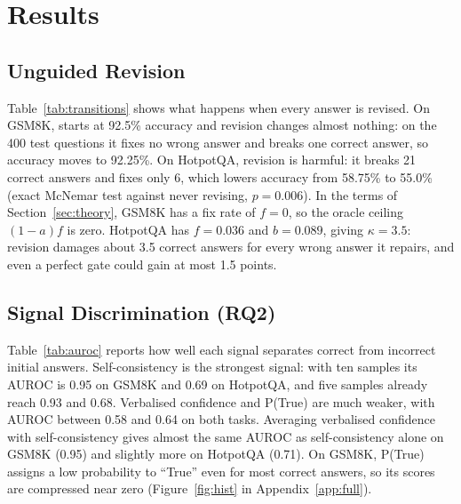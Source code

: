 \section{Results}
\label{sec:experiments}

\subsection{Unguided Revision}
\begin{table}[ht]
\centering
\caption{Outcome of unguided (always) revision on the test set ($N=400$ per dataset). We report initial accuracy $\text{Acc}(A_0)$, transition frequencies ($W\to R$, $R\to W$, $R\to R$, $W\to W$), accuracy delta $\Delta = \text{Acc}(A_1) - \text{Acc}(A_0)$, empirical fix rate $f$, break rate $b$, base accuracy $a$, and the gating threshold ratio $\kappa = \frac{a b}{(1-a)f}$.}
\label{tab:transitions}
\resizebox{\linewidth}{!}{}
\end{table}

Table~\ref{tab:transitions} shows what happens when every answer is revised. On GSM8K, \modelA{} starts at 92.5\% accuracy and revision changes almost nothing: on the 400 test questions it fixes no wrong answer and breaks one correct answer, so accuracy moves to 92.25\%. On HotpotQA, revision is harmful: it breaks 21 correct answers and fixes only 6, which lowers accuracy from 58.75\% to 55.0\% (exact McNemar test against never revising, $p=0.006$). In the terms of Section~\ref{sec:theory}, GSM8K has a fix rate of $f=0$, so the oracle ceiling $(1-a)f$ is zero. HotpotQA has $f=0.036$ and $b=0.089$, giving $\kappa=3.5$: revision damages about 3.5 correct answers for every wrong answer it repairs, and even a perfect gate could gain at most 1.5 points.

\subsection{Signal Discrimination (RQ2)}
\begin{table}[ht]
\centering
\caption{AUROC with 95\% bootstrap confidence intervals for predicting initial answer correctness $Y_0=1$ on the test set ($N=400$ per dataset). Higher values indicate stronger discrimination.}
\label{tab:auroc}
\resizebox{\linewidth}{!}{}
\end{table}

Table~\ref{tab:auroc} reports how well each signal separates correct from incorrect initial answers. Self-consistency is the strongest signal: with ten samples its AUROC is 0.95 on GSM8K and 0.69 on HotpotQA, and five samples already reach 0.93 and 0.68. Verbalised confidence and P(True) are much weaker, with AUROC between 0.58 and 0.64 on both tasks. Averaging verbalised confidence with self-consistency gives almost the same AUROC as self-consistency alone on GSM8K (0.95) and slightly more on HotpotQA (0.71). On GSM8K, P(True) assigns a low probability to ``True'' even for most correct answers, so its scores are compressed near zero (Figure~\ref{fig:hist} in Appendix~\ref{app:full}).

